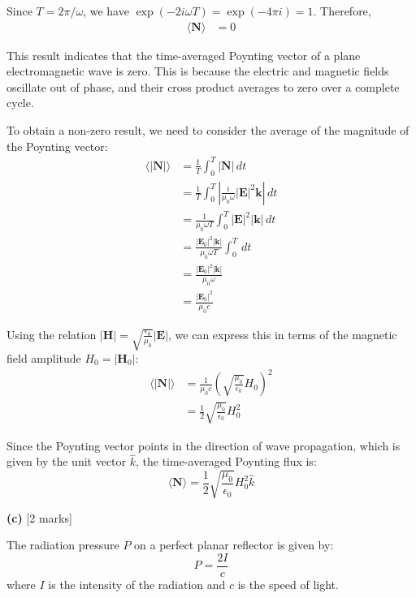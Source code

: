 \documentclass{article}
\begin{document}
Since $T = 2\pi/\omega$, we have $\exp(-2i \omega T) = \exp(-4\pi i) = 1$. Therefore,
\begin{align*}
\langle \mathbf{N} \rangle &= 0
\end{align*}

This result indicates that the time-averaged Poynting vector of a plane electromagnetic wave is zero. This is because the electric and magnetic fields oscillate out of phase, and their cross product averages to zero over a complete cycle.

To obtain a non-zero result, we need to consider the average of the magnitude of the Poynting vector:
\begin{align*}
\langle |\mathbf{N}| \rangle &= \frac{1}{T} \int_0^T |\mathbf{N}| \, dt \\
&= \frac{1}{T} \int_0^T \left| \frac{i}{\mu_0 \omega} |\mathbf{E}|^2 \mathbf{k} \right| \, dt \\
&= \frac{1}{\mu_0 \omega T} \int_0^T |\mathbf{E}|^2 |\mathbf{k}| \, dt \\
&= \frac{|\mathbf{E}_0|^2 |\mathbf{k}|}{\mu_0 \omega T} \int_0^T  \, dt \\
&= \frac{|\mathbf{E}_0|^2 |\mathbf{k}|}{\mu_0 \omega} \\
&= \frac{|\mathbf{E}_0|^2 }{ \mu_0 c}
\end{align*}

Using the relation $|\mathbf{H}| = \sqrt{\frac{\epsilon_0}{\mu_0}} |\mathbf{E}|$, we can express this in terms of the magnetic field amplitude $H_0 = |\mathbf{H}_0|$:
\begin{align*}
\langle |\mathbf{N}| \rangle &= \frac{1}{\mu_0 c} \left( \sqrt{\frac{\mu_0}{\epsilon_0}} H_0 \right)^2 \\
&= \frac{1}{2} \sqrt{\frac{\mu_0}{\epsilon_0}} H_0^2
\end{align*}

Since the Poynting vector points in the direction of wave propagation, which is given by the unit vector $\hat{k}$, the time-averaged Poynting flux is:
\begin{equation*}
\langle \mathbf{N} \rangle = \frac{1}{2} \sqrt{\frac{\mu_0}{\epsilon_0}} H_0^2 \hat{k}
\end{equation*}

\textbf{(c)} [2 marks]

The radiation pressure $P$ on a perfect planar reflector is given by:
\begin{equation*}
P = \frac{2I}{c}
\end{equation*}
where $I$ is the intensity of the radiation and $c$ is the speed of light.
\end{document}
